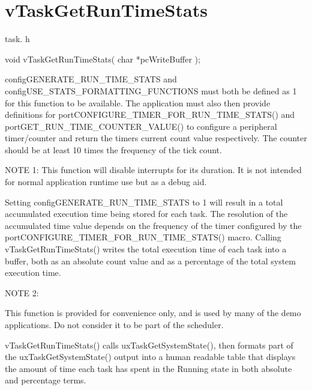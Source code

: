 \hypertarget{group__v_task_get_run_time_stats}{}\section{v\+Task\+Get\+Run\+Time\+Stats}
\label{group__v_task_get_run_time_stats}
task. h 
\begin{DoxyPre}void vTaskGetRunTimeStats( char *pcWriteBuffer );\end{DoxyPre}


config\+G\+E\+N\+E\+R\+A\+T\+E\+\_\+\+R\+U\+N\+\_\+\+T\+I\+M\+E\+\_\+\+S\+T\+A\+TS and config\+U\+S\+E\+\_\+\+S\+T\+A\+T\+S\+\_\+\+F\+O\+R\+M\+A\+T\+T\+I\+N\+G\+\_\+\+F\+U\+N\+C\+T\+I\+O\+NS must both be defined as 1 for this function to be available. The application must also then provide definitions for port\+C\+O\+N\+F\+I\+G\+U\+R\+E\+\_\+\+T\+I\+M\+E\+R\+\_\+\+F\+O\+R\+\_\+\+R\+U\+N\+\_\+\+T\+I\+M\+E\+\_\+\+S\+T\+A\+T\+S() and port\+G\+E\+T\+\_\+\+R\+U\+N\+\_\+\+T\+I\+M\+E\+\_\+\+C\+O\+U\+N\+T\+E\+R\+\_\+\+V\+A\+L\+U\+E() to configure a peripheral timer/counter and return the timers current count value respectively. The counter should be at least 10 times the frequency of the tick count.

N\+O\+TE 1\+: This function will disable interrupts for its duration. It is not intended for normal application runtime use but as a debug aid.

Setting config\+G\+E\+N\+E\+R\+A\+T\+E\+\_\+\+R\+U\+N\+\_\+\+T\+I\+M\+E\+\_\+\+S\+T\+A\+TS to 1 will result in a total accumulated execution time being stored for each task. The resolution of the accumulated time value depends on the frequency of the timer configured by the port\+C\+O\+N\+F\+I\+G\+U\+R\+E\+\_\+\+T\+I\+M\+E\+R\+\_\+\+F\+O\+R\+\_\+\+R\+U\+N\+\_\+\+T\+I\+M\+E\+\_\+\+S\+T\+A\+T\+S() macro. Calling v\+Task\+Get\+Run\+Time\+Stats() writes the total execution time of each task into a buffer, both as an absolute count value and as a percentage of the total system execution time.

N\+O\+TE 2\+:

This function is provided for convenience only, and is used by many of the demo applications. Do not consider it to be part of the scheduler.

v\+Task\+Get\+Run\+Time\+Stats() calls ux\+Task\+Get\+System\+State(), then formats part of the ux\+Task\+Get\+System\+State() output into a human readable table that displays the amount of time each task has spent in the Running state in both absolute and percentage terms.

